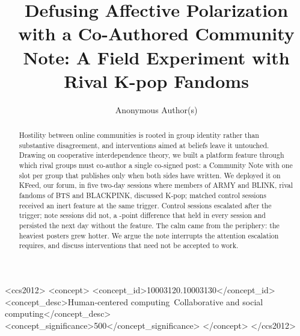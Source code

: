 \documentclass[manuscript,screen,review,anonymous]{acmart}
\begin{document}
\title{Defusing Affective Polarization with a Co-Authored Community Note:
A Field Experiment with Rival K-pop Fandoms}

\author{Anonymous Author(s)}

\renewcommand{\shortauthors}{Anon.}

\begin{abstract}
Hostility between online communities is rooted in group identity rather than
substantive disagreement, and interventions aimed at beliefs leave it
untouched. Drawing on cooperative interdependence theory, we built a platform
feature through which rival groups must co-author a single co-signed post: a
Community Note with one slot per group that publishes only when both sides
have written. We deployed it on KFeed, our forum, in five two-day
sessions where members of ARMY and BLINK, rival fandoms of BTS and
BLACKPINK, discussed K-pop; matched control sessions received an inert
feature at the same trigger. Control sessions escalated after the trigger;
note sessions did not, a \StatdidM-point difference that held in every
session and persisted the next day without the feature. The calm came from
the periphery: the heaviest posters grew hotter. We argue the note
interrupts the attention escalation requires, and discuss interventions
that need not be accepted to work.
\end{abstract}

\begin{CCSXML}
<ccs2012>
   <concept>
       <concept_id>10003120.10003130</concept_id>
       <concept_desc>Human-centered computing~Collaborative and social computing</concept_desc>
       <concept_significance>500</concept_significance>
   </concept>
 </ccs2012>
\end{CCSXML}


\end{document}
